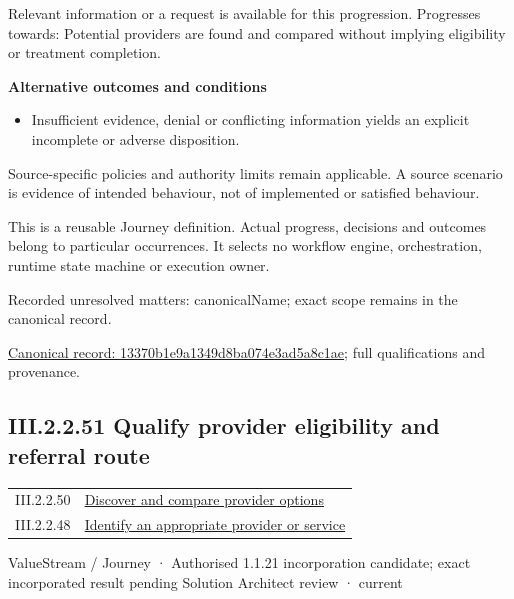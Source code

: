 Relevant information or a request is available for this progression. Progresses towards: Potential providers are found and compared without implying eligibility or treatment completion.



\par\medskip\textbf{Alternative outcomes and conditions}\par


\begin{itemize}


\item Insufficient evidence, denial or conflicting information yields an explicit incomplete or adverse disposition.

\end{itemize}


Source-specific policies and authority limits remain applicable. A source scenario is evidence of intended behaviour, not of implemented or satisfied behaviour.



This is a reusable Journey definition. Actual progress, decisions and outcomes belong to particular occurrences. It selects no workflow engine, orchestration, runtime state machine or execution owner.


{\small Recorded unresolved matters: canonicalName; exact scope remains in the canonical record.}\par
{\footnotesize \href{../../../../../../../continuum/strategy/value-stream/13370b1e9a1349d8ba074e3ad5a8c1ae.md}{Canonical record: 13370b1e9a1349d8ba074e3ad5a8c1ae}; full qualifications and provenance.}\par
\subsection*{III.2.2.51 Qualify provider eligibility and referral route}
\label{navigation:III.2.2.51}

\begin{longtable}{p{.22\linewidth}p{.73\linewidth}}
III.2.2.50 & \hyperref[element:13370b1e9a1349d8ba074e3ad5a8c1ae]{Discover and compare provider options} \\
III.2.2.48 & \hyperref[element:5d725d797f754857bf1b3d49d8f25044]{Identify an appropriate provider or service} \\
\end{longtable}
\label{element:1406d16dbefa4752af95ca6041cd5712}
{\small ValueStream / Journey · Authorised 1.1.21 incorporation candidate; exact incorporated result pending Solution Architect review · current}\par

